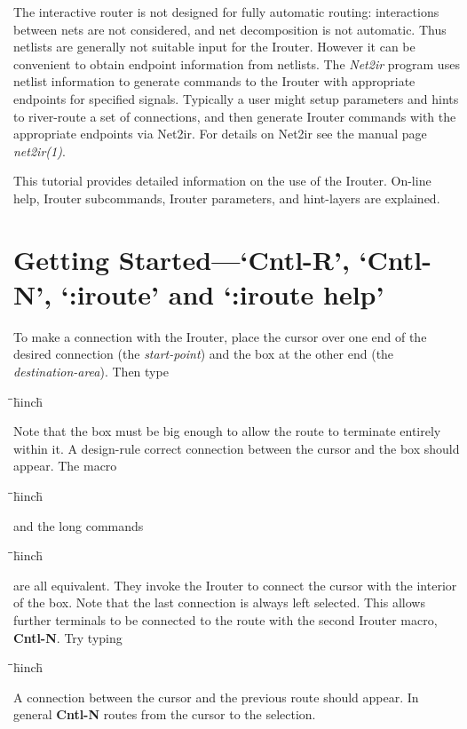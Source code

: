 \documentclass[letterpaper,twoside,12pt]{article}
\def\hinch{\hspace*{0.5in}}
\def\starti{\begin{center}\begin{tabbing}\hinch\=\hinch\=\hinch\=hinch\hinch\=\kill}
\def\endi{\end{tabbing}\end{center}}
\def\ii{\>\>\>}
\begin{document}
The interactive router is not designed for fully 
automatic routing:  interactions between nets 
are not considered, and net decomposition is 
not automatic.  Thus netlists are generally
not suitable input for the Irouter.  However it can be convenient to obtain
endpoint information from netlists.  The {\itshape Net2ir} program uses
netlist information to generate commands 
to the Irouter with appropriate endpoints for specified
signals.  Typically a user might
setup parameters and hints to river-route a set of connections,
and then generate Irouter commands with the appropriate endpoints via
Net2ir.  For details on Net2ir see the
manual page {\itshape net2ir(1)}.

This tutorial provides detailed information on the use 
of the Irouter.  On-line help, Irouter 
subcommands, Irouter parameters, and hint-layers are explained.

\section{Getting Started---`Cntl-R', `Cntl-N', `:iroute' and `:iroute help'}

To make a connection with the Irouter, place the cursor over one
end of the desired connection (the {\itshape start-point}) and the box at the
other end (the {\itshape destination-area}).  Then type

\starti
   \ii {\bfseries Cntl-R}
\endi

Note that the box must be big 
enough to allow the route to terminate entirely within it.  A 
design-rule correct connection between the cursor and the box should 
appear.  The macro 

\starti
   \ii {\bfseries Cntl-R}
\endi

and the long commands

\starti
   \ii {\bfseries :iroute} \\
   \ii {\bfseries :iroute route}
\endi

are all equivalent.  They invoke the Irouter to connect the cursor with
the interior of the box.  Note that the last connection is always left
selected.   This allows further terminals to be
connected to the route with the second Irouter macro, {\bfseries Cntl-N}.  Try
typing

\starti
   \ii {\bfseries Cntl-N}
\endi

A connection between the cursor and the previous route should appear.  In
general {\bfseries Cntl-N} routes from the cursor to the selection.
\end{document}
